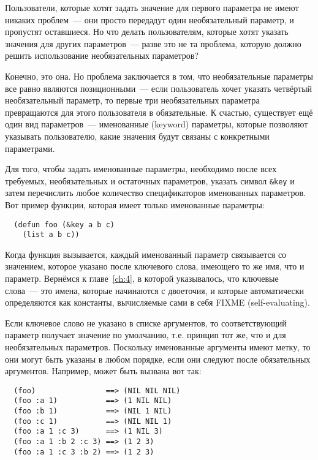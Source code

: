 Пользователи, которые хотят задать значение для первого параметра не имеют никаких
проблем~--- они просто передадут один необязательный параметр, и пропустят оставшиеся.  Но
что делать пользователям, которые хотят указать значения для других параметров~--- разве
это не та проблема, которую должно решить использование необязательных параметров?

Конечно, это она.  Но проблема заключается в том, что необязательные параметры все равно
являются позиционными~--- если пользователь хочет указать четвёртый необязательный
параметр, то первые три необязательных параметра превращаются для этого пользователя в
обязательные.  К счастью, существует ещё один вид параметров~--- именованные (keyword)
параметры, которые позволяют указывать пользователю, какие значения будут связаны с
конкретными параметрами.

Для того, чтобы задать именованные параметры, необходимо после всех требуемых,
необязательных и остаточных параметров, указать символ \lstinline!&key! и затем
перечислить любое количество спецификаторов именованных параметров.  Вот пример функции,
которая имеет только именованные параметры:

\begin{lstlisting}
  (defun foo (&key a b c) 
    (list a b c))
\end{lstlisting}

Когда функция вызывается, каждый именованный параметр связывается со значением, которое
указано после ключевого слова, имеющего то же имя, что и параметр.  Вернёмся к главе~\ref{ch:4}, в
которой указывалось, что ключевые слова~--- это имена, которые начинаются с двоеточия, и
которые автоматически определяются как константы, вычисляемые сами в себя FIXME
(self-evaluating).

Если ключевое слово не указано в списке аргументов, то соответствующий параметр получает
значение по умолчанию, т.е. принцип тот же, что и для необязательных параметров.
Поскольку именованные аргументы имеют метку, то они могут быть указаны в любом порядке,
если они следуют после обязательных аргументов.  Например,  может быть вызвана
вот так:

\begin{verbatim}
  (foo)                ==> (NIL NIL NIL)
  (foo :a 1)           ==> (1 NIL NIL)
  (foo :b 1)           ==> (NIL 1 NIL)
  (foo :c 1)           ==> (NIL NIL 1)
  (foo :a 1 :c 3)      ==> (1 NIL 3)
  (foo :a 1 :b 2 :c 3) ==> (1 2 3)
  (foo :a 1 :c 3 :b 2) ==> (1 2 3)
\end{verbatim}

